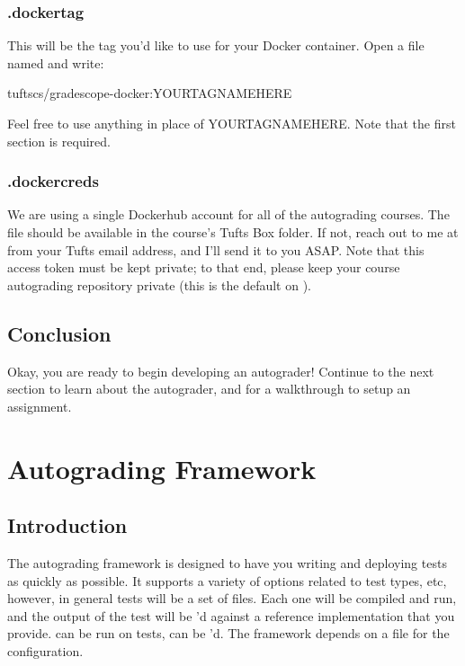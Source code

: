 \documentclass[11pt]{report}
\begin{document}
\subsection*{.dockertag}
This will be the tag you'd like to use for your Docker container. Open a file named 
and write:
\begin{bashcodeblock}
tuftscs/gradescope-docker:YOURTAGNAMEHERE      
\end{bashcodeblock}
Feel free to use anything in place of YOURTAGNAMEHERE. Note that the first section is required. 

\subsection*{.dockercreds}
We are using a single Dockerhub account for all of the autograding courses. The file
 should be available in the course's Tufts Box folder. If not, reach out to 
me at  from your Tufts email address, and I'll send it to you ASAP. 
Note that this access token must be kept private; to that end, please keep your course autograding
repository private (this is the default on ).

\section*{Conclusion}
Okay, you are ready to begin developing an autograder! Continue to the next section to learn 
about the autograder, and for a walkthrough to setup an assignment. 

\chapter*{Autograding Framework}
\section*{Introduction}
The autograding framework is designed to have you writing and deploying tests as quickly as possible. 
It supports a variety of options related to test types, etc, however, in general tests will be a 
set of  files. Each one will be compiled and run, and the output of the test will be 'd
against a reference implementation that you provide.  can be run on tests,  can be
'd. The framework depends on a  file for the configuration. 
\end{document}
